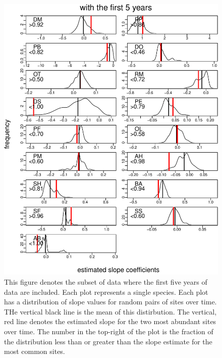 \documentclass[]{article}
\begin{document}
\begin{figure}
\centering
\includegraphics{Empirical_Investigation_files/figure-latex/unnamed-chunk-2-1.pdf}
\caption{This figure denotes the subset of data where the first five
years of data are included. Each plot represents a single species. Each
plot has a distribution of slope values for random pairs of sites over
time. THe vertical black line is the mean of this distirbution. The
vertical, red line denotes the estimated slope for the two most abundant
sites over time. The number in the top-right of the plot is the fraction
of the distribution less than or greater than the slope estimate for the
most common sites.\label{fig:common_vs_random_with5}}
\end{figure}
\end{document}
